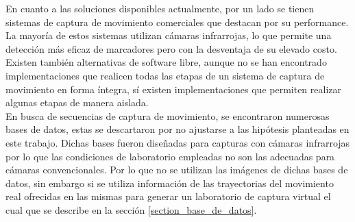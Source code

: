 \hspace*{0.5cm}En cuanto a las soluciones disponibles actualmente, por un lado se tienen sistemas de captura de movimiento comerciales que destacan por su performance. La mayoría de estos sistemas utilizan cámaras infrarrojas, lo que permite una detección más eficaz de marcadores pero con la desventaja de su elevado costo. Existen también alternativas de software libre, aunque no se han encontrado implementaciones que realicen todas las etapas de un sistema de captura de movimiento en forma íntegra, sí existen implementaciones que permiten realizar algunas etapas de manera aislada.\\ %
\hspace*{0.5cm}En busca de secuencias de captura de movimiento, se encontraron numerosas bases de datos, estas se descartaron por no ajustarse a las hipótesis planteadas en este trabajo. Dichas bases fueron diseñadas para capturas con cámaras infrarrojas por lo que las condiciones de laboratorio empleadas no son las adecuadas para cámaras convencionales. Por lo que no se utilizan las imágenes de dichas bases de datos, sin embargo si se utiliza información de las trayectorias del movimiento real ofrecidas en las mismas para generar un laboratorio de captura virtual el cual que se describe en  la sección \ref{section_base_de_datos}.

  


















